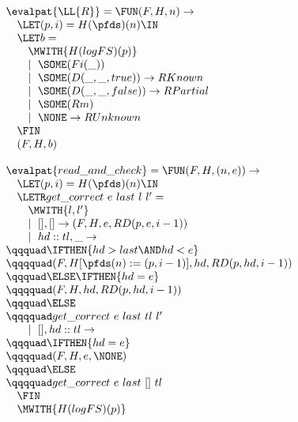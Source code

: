 \begin{figure*}
\begin{minipage}[t]{0.5\linewidth}
\begin{displaymath}
\begin{array}{l}
\evalpat{\LL{R}} = \FUN (F,H,n) \rightarrow \\
\quad \LET (p,i) = H(\pfds)(n) \IN \\
\quad \LET b = \\
\qquad \MWITH{H(logFS)(p)} \\
\qquad \mid~\SOME(Fi(\_)) \\
\qquad \mid~\SOME(D(\_,\_,true)) \rightarrow RKnown \\
\qquad \mid~\SOME(D(\_,\_,false)) \rightarrow RPartial \\
\qquad \mid~\SOME(Rm) \\
\qquad \mid~\NONE \rightarrow RUnknown \\
\quad \FIN \\
\quad (F,H,b) \\
\\ %
\evalpat{read\_and\_check} = \FUN (F,H,(n,e)) \rightarrow \\
\quad \LET (p,i) = H(\pfds)(n) \IN \\
\quad \LETR get\_correct~e~last~l~l' = \\
\qquad \MWITH{l,l'} \\
\qquad \mid~[],[] \rightarrow (F,H,e,RD(p,e,i-1)) \\
\qquad \mid~hd :: tl,\_ \rightarrow \\
\qqquad \IFTHEN{hd > last \AND hd < e} \\
\qqqquad (F,H[\pfds(n) := (p,i-1)],hd,RD(p,hd,i-1)) \\
\qqquad \ELSE \IFTHEN{hd = e} \\
\qqqquad (F,H,hd,RD(p,hd,i-1)) \\
\qqquad \ELSE \\
\qqqquad get\_correct~e~last~tl~l' \\
\qquad \mid~[],hd :: tl \rightarrow \\
\qqquad \IFTHEN{hd = e} \\
\qqqquad (F,H,e,\NONE) \\
\qqquad \ELSE \\
\qqqquad get\_correct~e~last~[]~tl \\
\quad \FIN \\
\quad \MWITH{H(logFS)(p)} \\

\end{array}
\end{displaymath}
\end{minipage}
\end{figure*}
